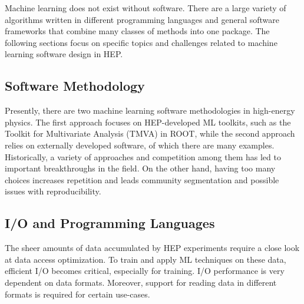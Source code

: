 
Machine learning does not exist without software. There are a large variety of algorithms written in different programming languages and general software frameworks that combine many classes of methods into one package. The following sections focus on specific topics and challenges related to machine learning software design in HEP.



\subsection{Software Methodology}
Presently, there are two machine learning software methodologies in high-energy physics. The first approach focuses on HEP-developed ML toolkits, such as the Toolkit for Multivariate Analysis (TMVA) in ROOT, while the second approach relies on externally developed software, of which there are many examples. Historically, a variety of approaches and competition among them has led to important breakthroughs in the field. On the other hand, having too many choices increases repetition and leads community segmentation and possible issues with reproducibility.


\subsection{I/O and Programming Languages}
\label{sec:software_IO}
The sheer amounts of data accumulated by HEP experiments require a close look at data access optimization. To train and apply ML techniques on these data, efficient I/O becomes critical, especially for training. I/O performance is very dependent on data formats. Moreover, support for reading data in different formats is required for certain use-cases.

